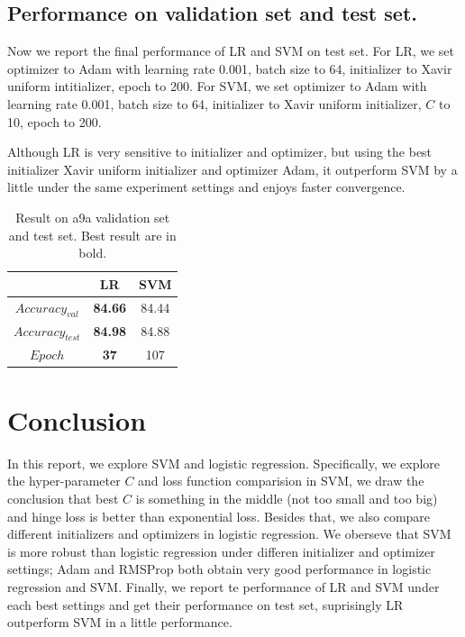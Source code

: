 \documentclass[journal, a4paper]{IEEEtran}
\begin{document}
\subsection{Performance on validation set and test set.}
Now we report the final performance of LR and SVM on test set. For LR, we set optimizer to Adam with learning rate 0.001, batch size to 64, initializer to Xavir uniform intitializer, epoch to 200. For SVM, we set optimizer to Adam with learning rate 0.001, batch size to 64, initializer to Xavir uniform initializer, $C$ to 10, epoch to 200. \par
Although LR is very sensitive to initializer and optimizer, but using the best initializer Xavir uniform initializer and optimizer Adam, it outperform SVM by a little under the same experiment settings and enjoys faster convergence. \par

\begin{table}[!hbt]
	\begin{center}
		\caption{Result on a9a validation set and test set. Best result are in bold.}
		\label{tab:final_performance}
		\begin{tabular}{|c|c|c|}
			\hline
			& LR & SVM \\
			\hline
			$Accuracy_{val}$   & \textbf{84.66} & 84.44   \\
			\hline
			$Accuracy_{test}$   & \textbf{84.98} & 84.88   \\
			\hline
			$Epoch$  & \textbf{37} & 107   \\
			\hline
		\end{tabular}
	\end{center}
\end{table} \par

\section{Conclusion}
In this report, we explore SVM and logistic regression. Specifically, we explore the hyper-parameter $C$ and loss function comparision in SVM, we draw the conclusion that best $C$ is something in the middle (not too small and too big) and hinge loss is better than exponential loss. Besides that, we also compare different initializers and optimizers in logistic regression. We oberseve that SVM is more robust than logistic regression under differen initializer and optimizer settings; Adam and RMSProp both obtain very good performance in logistic regression and SVM. Finally, we report te performance of LR and SVM under each best settings and get their performance on test set, suprisingly LR outperform SVM in a little performance.\par


\end{document}
